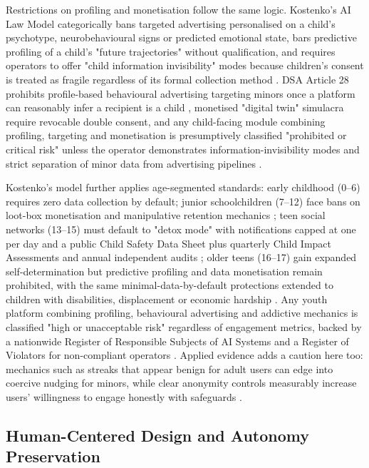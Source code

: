 \documentclass[11pt]{article}
\begin{document}
Restrictions on profiling and monetisation follow the same logic. Kostenko's AI Law Model categorically bans targeted advertising personalised on a child's psychotype, neurobehavioural signs or predicted emotional state, bars predictive profiling of a child's "future trajectories" without qualification, and requires operators to offer "child information invisibility" modes because children's consent is treated as fragile regardless of its formal collection method \parencites[20]{2977039}[224]{2977039}[223]{2977039}[44]{2977039}. DSA Article 28 prohibits profile-based behavioural advertising targeting minors once a platform can reasonably infer a recipient is a child \parencites[19]{6941611}, monetised "digital twin" simulacra require revocable double consent, and any child-facing module combining profiling, targeting and monetisation is presumptively classified "prohibited or critical risk" unless the operator demonstrates information-invisibility modes and strict separation of minor data from advertising pipelines \parencites[140]{2977039}[224]{2977039}[19]{6941611}[223]{2977039}[44]{2977039}.

Kostenko's model further applies age-segmented standards: early childhood (0--6) requires zero data collection by default; junior schoolchildren (7--12) face bans on loot-box monetisation and manipulative retention mechanics \parencites[217]{2977039}; teen social networks (13--15) must default to "detox mode" with notifications capped at one per day and a public Child Safety Data Sheet plus quarterly Child Impact Assessments and annual independent audits \parencites[221]{2977039}; older teens (16--17) gain expanded self-determination but predictive profiling and data monetisation remain prohibited, with the same minimal-data-by-default protections extended to children with disabilities, displacement or economic hardship \parencites[219]{2977039}. Any youth platform combining profiling, behavioural advertising and addictive mechanics is classified "high or unacceptable risk" regardless of engagement metrics, backed by a nationwide Register of Responsible Subjects of AI Systems and a Register of Violators for non-compliant operators \parencites[82]{2977039}. Applied evidence adds a caution here too: mechanics such as streaks that appear benign for adult users can edge into coercive nudging for minors, while clear anonymity controls measurably increase users' willingness to engage honestly with safeguards \parencites[5]{4426226}.

\subsection{Human-Centered Design and Autonomy Preservation}
\end{document}
